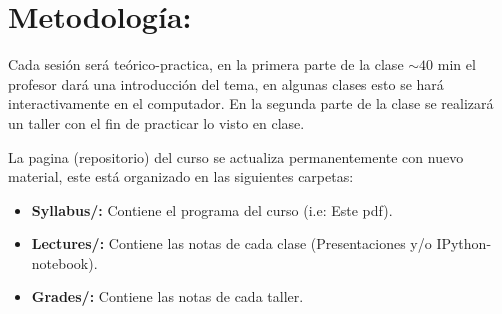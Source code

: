 \documentclass[letterpaper]{article}
\begin{document}
\section*{Metodolog\'ia:}

Cada sesi\'on ser\'a te\'orico-practica, en la primera parte de la clase $\sim 40$ min el profesor
dar\'a una introducci\'on del tema, en algunas clases esto se har\'a interactivamente en el computador.
En la segunda parte de la clase se realizar\'a un taller con el fin de practicar
lo visto en clase.

La pagina (repositorio) del curso se actualiza permanentemente con nuevo material, este est\'a organizado en las siguientes carpetas:\\

\begin{itemize}
\item \textbf{Syllabus/:} Contiene el programa del curso (i.e: Este pdf).
\item \textbf{Lectures/:} Contiene las notas de cada clase (Presentaciones y/o IPython-notebook).
\item \textbf{Grades/:} Contiene las notas de cada taller.
\end{itemize}
\end{document}
